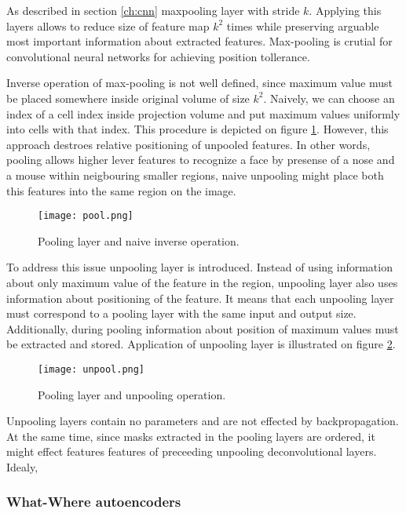 As described in section \ref{ch:cnn} maxpooling layer with stride $k$.
Applying this layers allows to reduce size of feature map $k^2$ times while preserving arguable most important information about extracted features.
Max-pooling is crutial for convolutional neural networks for achieving position tollerance.

Inverse operation of max-pooling is not well defined, since maximum value must be placed somewhere inside original volume of size $k^2$. Naively, we can choose an index of a cell index inside projection volume and put maximum values uniformly into cells with that index.
This procedure is depicted on figure \ref{fig:pool}.
However, this approach destroes relative positioning of unpooled features.
In other words, pooling allows higher lever features to recognize a face by presense of a nose and a mouse within neigbouring smaller regions, naive unpooling might place both this features into the same region on the image.

\begin{figure}[h!]
  \centering
    \texttt{[image: pool.png]}
  \caption{Pooling layer and naive inverse operation.}
  \label{fig:pool}
\end{figure}

To address this issue unpooling layer is introduced. Instead of using information about only maximum value of the feature in the region, unpooling layer also uses information about positioning of the feature. It means that each unpooling layer must correspond to a pooling layer with the same input and output size. Additionally, during pooling information about position of maximum values must be extracted and stored. Application of unpooling layer is illustrated on figure \ref{fig:unpool}.

\begin{figure}[h!]
  \centering
    \texttt{[image: unpool.png]}
  \caption{Pooling layer and unpooling operation.}
  \label{fig:unpool}
\end{figure}

Unpooling layers contain no parameters and are not effected by backpropagation. At the same time, since masks extracted in the pooling layers are ordered, it might effect features features of preceeding unpooling deconvolutional layers. Idealy,

\subsubsection{What-Where autoencoders}



